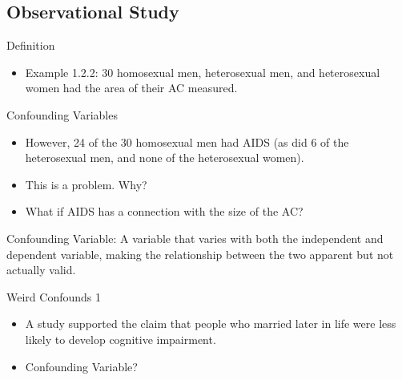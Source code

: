 \documentclass{beamer}
\begin{document}
\subsection{Observational Study}

\begin{frame}{Definition}

\begin{itemize}
  \begin{block}{Observational Study:} A study in which the researcher collects data from subjects but is not manipulating the conditions that lead to the measurement of interest.\end{block}
  \item Example 1.2.2: 30 homosexual men, heterosexual men, and heterosexual women had the area of their AC measured.
  
\end{itemize}

\end{frame}

\begin{frame}{Confounding Variables}

\begin{itemize}
  \item However, 24 of the 30 homosexual men had AIDS (as did 6 of the heterosexual men, and none of the heterosexual women).
  \item This is a problem. Why?
\pause
  \item What if AIDS has a connection with the size of the AC?
\end{itemize}

\begin{block}{Confounding Variable:} A variable that varies with both the independent and dependent variable, making the relationship between the two apparent but not actually valid.\end{block}

\end{frame}

\begin{frame}{Weird Confounds 1}
\begin{itemize}
  \item A study supported the claim that people who married later in life were less likely to develop cognitive impairment. 
  \item Confounding Variable?
\end{itemize}
\end{frame}

\end{document}
